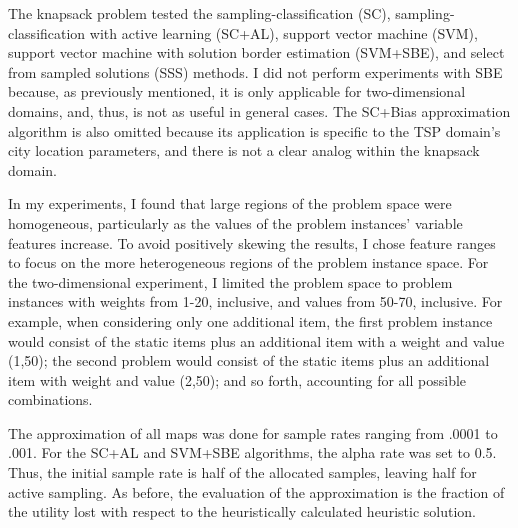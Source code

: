 The knapsack problem tested the sampling-classification (SC), sampling-classification with active learning (SC+AL), support vector machine (SVM), support vector machine with solution border estimation (SVM+SBE), and select from sampled solutions (SSS) methods.  I did not perform experiments with SBE because, as previously mentioned, it is only applicable for two-dimensional domains, and, thus, is not as useful in general cases.  The SC+Bias approximation algorithm is also omitted because its application is specific to the TSP domain's city location parameters, and there is not a clear analog within the knapsack domain.

In my experiments, I found that large regions of the problem space were homogeneous, particularly as the values of the problem instances' variable features increase.  To avoid positively skewing the results, I chose feature ranges to focus on the more heterogeneous regions of the problem instance space.  For the two-dimensional experiment, I limited the problem space to problem instances with  weights from  1-20, inclusive, and values from 50-70, inclusive.  For example, when considering only one additional item, the first problem instance would consist of the static items plus an additional item with a weight and value (1,50); the second problem would consist of the static items plus an additional item with weight and value (2,50); and so forth, accounting for all possible combinations.

The approximation of all maps was done for  sample rates ranging from .0001 to .001.  For the SC+AL and SVM+SBE algorithms, the alpha rate was set to 0.5.  Thus, the initial sample rate is half of the allocated samples, leaving half for active sampling.  As before, the evaluation of the approximation is the fraction of the utility lost with respect to the heuristically calculated heuristic solution.


